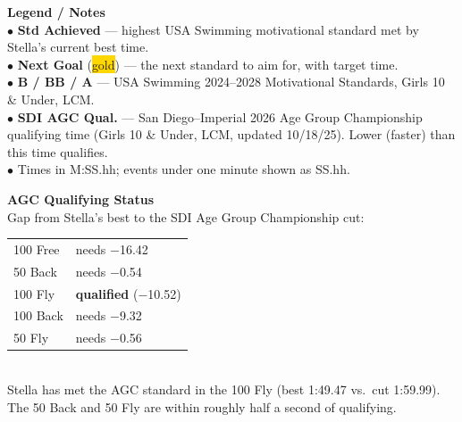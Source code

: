 \documentclass[11pt,landscape]{article}
\begin{document}
\vspace{10pt}
\noindent\begin{minipage}{0.62\textwidth}
{\footnotesize
\textbf{Legend / Notes}\\
$\bullet$ \textbf{Std Achieved} --- highest USA Swimming motivational standard met by Stella's current best time.\\
$\bullet$ \textbf{Next Goal} (\colorbox{gold}{gold}) --- the next standard to aim for, with target time.\\
$\bullet$ \textbf{B / BB / A} --- USA Swimming 2024--2028 Motivational Standards, Girls 10 \& Under, LCM.\\
$\bullet$ \textbf{SDI AGC Qual.} --- San Diego--Imperial 2026 Age Group Championship qualifying time (Girls 10 \& Under, LCM, updated 10/18/25). Lower (faster) than this time qualifies.\\
$\bullet$ Times in M:SS.hh; events under one minute shown as SS.hh.}
\end{minipage}\hfill
\begin{minipage}{0.34\textwidth}
{\footnotesize
\textbf{AGC Qualifying Status}\\
Gap from Stella's best to the SDI Age Group Championship cut:\\[3pt]
\begin{tabular}{ll}
100 Free & needs $-$16.42 \\
50 Back  & needs $-$0.54 \\
100 Fly  & \textbf{qualified} ($-$10.52) \\
100 Back & needs $-$9.32 \\
50 Fly   & needs $-$0.56 \\
\end{tabular}\\[3pt]
{\scriptsize Stella has met the AGC standard in the 100 Fly (best 1:49.47 vs.\ cut 1:59.99). The 50 Back and 50 Fly are within roughly half a second of qualifying.}}
\end{minipage}
\end{document}
